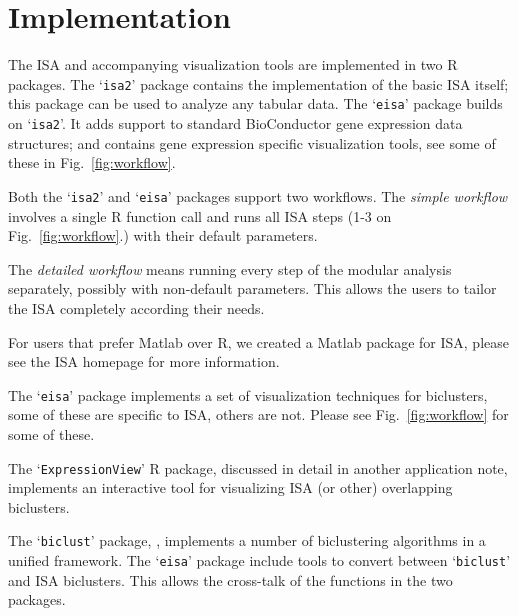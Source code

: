 \documentclass{bioinfo}
\newcommand{\Rpackage}[1]{`\texttt{#1}'}
\begin{document}
\section{Implementation}%
\label{sec:implementation}

The ISA and accompanying visualization tools are implemented in two R
packages. The \Rpackage{isa2} package contains the implementation of
the basic ISA itself; this package can be used to analyze any tabular
data. The \Rpackage{eisa} package builds on \Rpackage{isa2}. It adds
support to standard BioConductor gene expression data structures; and
contains gene expression specific visualization tools, see some of
these in Fig.~\ref{fig:workflow}.

Both the \Rpackage{isa2} and \Rpackage{eisa} packages support two
workflows. The \emph{simple workflow} involves a single R function
call and runs all ISA steps (1-3 on Fig.~\ref{fig:workflow}.) with
their default parameters.

The \emph{detailed workflow} means running every step of the modular
analysis separately, possibly with non-default parameters. This allows
the users to tailor the ISA completely according their needs.

For users that prefer Matlab over R, we created a Matlab package for
ISA, please see the ISA homepage for more information.


The \Rpackage{eisa} package implements a set of visualization
techniques for biclusters, some of these are specific to ISA, others
are not. Please see Fig.~\ref{fig:workflow} for some of these.

The \Rpackage{ExpressionView} R package, discussed in detail in
another application note, implements an interactive tool
for visualizing ISA (or other) overlapping biclusters.


The \Rpackage{biclust} package, \cite{biclust}, implements a number of
biclustering algorithms in a unified framework. The \Rpackage{eisa}
package include tools to convert between \Rpackage{biclust} and ISA
biclusters. This allows the cross-talk of the functions in the two
packages.
\end{document}
